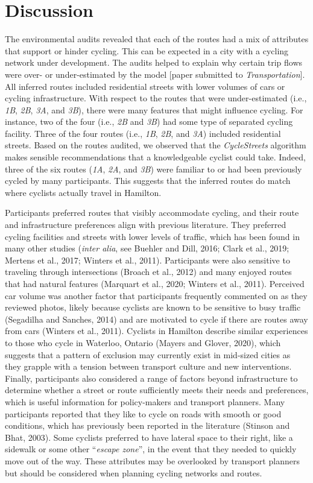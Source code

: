 \documentclass[]{elsarticle} %
\begin{document}
\hypertarget{sec:discussion}{%
\section{Discussion}\label{sec:discussion}}

The environmental audits revealed that each of the routes had a mix of
attributes that support or hinder cycling. This can be expected in a
city with a cycling network under development. The audits helped to
explain why certain trip flows were over- or under-estimated by the
model {[}paper submitted to \emph{Transportation}{]}. All inferred
routes included residential streets with lower volumes of cars or
cycling infrastructure. With respect to the routes that were
under-estimated (i.e., \emph{1B}, \emph{2B}, \emph{3A}, and \emph{3B}),
there were many features that might influence cycling. For instance, two
of the four (i.e., \emph{2B} and \emph{3B}) had some type of separated
cycling facility. Three of the four routes (i.e., \emph{1B}, \emph{2B},
and \emph{3A}) included residential streets. Based on the routes
audited, we observed that the \emph{CycleStreets} algorithm makes
sensible recommendations that a knowledgeable cyclist could take.
Indeed, three of the six routes (\emph{1A}, \emph{2A}, and \emph{3B})
were familiar to or had been previously cycled by many participants.
This suggests that the inferred routes do match where cyclists actually
travel in Hamilton.

Participants preferred routes that visibly accommodate cycling, and
their route and infrastructure preferences align with previous
literature. They preferred cycling facilities and streets with lower
levels of traffic, which has been found in many other studies
(\emph{inter alia}, see Buehler and Dill, 2016; Clark et al., 2019;
Mertens et al., 2017; Winters et al., 2011). Participants were also
sensitive to traveling through intersections (Broach et al., 2012) and
many enjoyed routes that had natural features (Marquart et al., 2020;
Winters et al., 2011). Perceived car volume was another factor that
participants frequently commented on as they reviewed photos, likely
because cyclists are known to be sensitive to busy traffic (Segadilha
and Sanches, 2014) and are motivated to cycle if there are routes away
from cars (Winters et al., 2011). Cyclists in Hamilton describe similar
experiences to those who cycle in Waterloo, Ontario (Mayers and Glover,
2020), which suggests that a pattern of exclusion may currently exist in
mid-sized cities as they grapple with a tension between transport
culture and new interventions. Finally, participants also considered a
range of factors beyond infrastructure to determine whether a street or
route sufficiently meets their needs and preferences, which is useful
information for policy-makers and transport planners. Many participants
reported that they like to cycle on roads with smooth or good
conditions, which has previously been reported in the literature
(Stinson and Bhat, 2003). Some cyclists preferred to have lateral space
to their right, like a sidewalk or some other ``\emph{escape zone}'', in
the event that they needed to quickly move out of the way. These
attributes may be overlooked by transport planners but should be
considered when planning cycling networks and routes.
\end{document}
